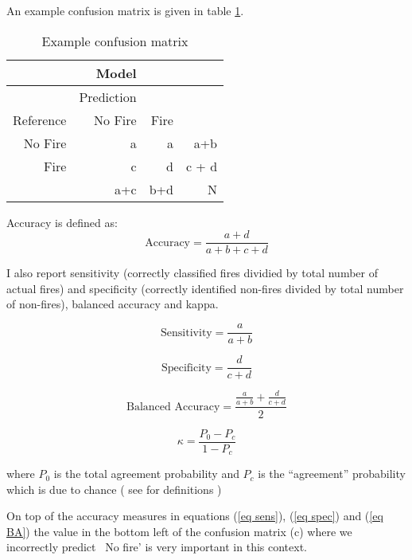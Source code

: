 \documentclass{article}
\begin{document}
An example confusion matrix is given in table \ref{table:ex}. 
\begin{table}[ht]
	\centering
	\begin{tabular}{r|rr|r}
		& Model & & \\ 
		\hline
		& Prediction   & &  \\ 
		Reference & No Fire & Fire & \\ 
		\hline
		No Fire & a & a & a+b \\ 
		Fire & c & d  & c + d \\ 
		\hline
		 & a+c & b+d & N \\
	\end{tabular}
	\caption{Example confusion matrix}
	\label{table:ex}
\end{table}

Accuracy is defined as:
\begin{equation}
\label{eq acc}
\mbox{Accuracy} = \frac{a + d}{a+b+c+d}
\end{equation}

I also report sensitivity (correctly classified fires dividied by total number of actual fires) and specificity (correctly identified non-fires divided by total number of non-fires), balanced accuracy and kappa. 

\begin{equation}
\label{eq sens}
\mbox{Sensitivity} = \frac{a }{a+b}
\end{equation}

\begin{equation}
\label{eq spec}
\mbox{Specificity} = \frac{d}{c+d}
\end{equation}


\begin{equation}
\label{eq BA}
\mbox{Balanced Accuracy} = \frac{\frac{a }{a+b} + \frac{d}{c+d} }{2}
\end{equation}


\begin{equation}
\label{eq:K}
\kappa = \frac{P_0 - P_c}{1-P_c}
\end{equation}

where $P_0$ is the total agreement probability and $P_c$ is the “agreement” probability which is due to chance ( see \cite{kappa} for definitions )

On top of the accuracy measures in equations (\ref{eq sens}), (\ref{eq spec}) and (\ref{eq BA}) the value in the bottom left of the confusion matrix (c) where we incorrectly predict ~No fire' is very important in this context. 
\end{document}
